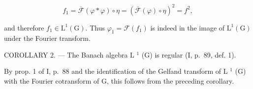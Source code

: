 \[
f _ {1} = \overline {{\mathcal {F}}} (\varphi * \varphi) \circ \eta = (\overline {{\mathcal {F}}} (\varphi) \circ \eta) ^ {2} = f ^ {2},
\]

and therefore \(f_{1} \in \mathrm{L}^{1}(\mathrm{G})\). Thus \(\varphi_{1} = \mathcal{F}(f_{1})\) is indeed in the image of \(\mathrm{L}^{1}(\mathrm{G})\) under the Fourier transform.

COROLLARY 2. --- The Banach algebra L \(^{1}\) (G) is regular (I, p.~89, def. 1).

By prop. 1 of I, p.~88 and the identification of the Gelfand transform of L \(^{1}\) (G) with the Fourier cotransform of G, this follows from the preceding corollary.
\relax{}
